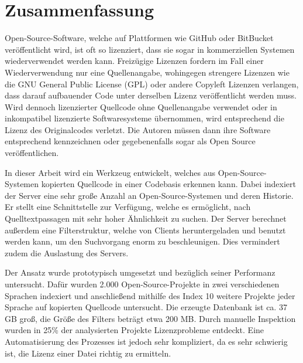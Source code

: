 \chapter{Zusammenfassung}
Open-Source-Software, welche auf Plattformen wie GitHub oder BitBucket veröffentlicht wird, ist oft so lizenziert, dass sie sogar in kommerziellen Systemen wiederverwendet werden kann.
Freizügige Lizenzen fordern im Fall einer Wiederverwendung nur eine Quellenangabe, wohingegen strengere Lizenzen wie die GNU General Public License (GPL) oder andere Copyleft Lizenzen verlangen, dass darauf aufbauender Code unter derselben Lizenz veröffentlicht werden muss.
Wird dennoch lizenzierter Quellcode ohne Quellenangabe verwendet oder in inkompatibel lizenzierte Softwaresysteme übernommen, wird entsprechend die Lizenz des Originalcodes verletzt.
Die Autoren müssen dann ihre Software entsprechend kennzeichnen oder gegebenenfalls sogar als Open Source veröffentlichen.

In dieser Arbeit wird ein Werkzeug entwickelt, welches aus Open-Source-Systemen kopierten Quellcode in einer Codebasis erkennen kann.
Dabei indexiert der Server eine sehr große Anzahl an Open-Source-Systemen und deren Historie.
Er stellt eine Schnittstelle zur Verfügung, welche es ermöglicht, nach Quelltextpassagen mit sehr hoher Ähnlichkeit zu suchen.
Der Server berechnet außerdem eine Filterstruktur, welche von Clients heruntergeladen und benutzt werden kann, um den Suchvorgang enorm zu beschleunigen.
Dies vermindert zudem die Auslastung des Servers.

Der Ansatz wurde prototypisch umgesetzt und bezüglich seiner Performanz untersucht.
Dafür wurden 2.000 Open-Source-Projekte in zwei verschiedenen Sprachen indexiert und anschließend mithilfe des Index 10 weitere Projekte jeder Sprache auf kopierten Quellcode untersucht.
Die erzeugte Datenbank ist ca. 37 GB groß, die Größe des Filters beträgt etwa 200 MB.
Durch manuelle Inspektion wurden in 25\% der analysierten Projekte Lizenzprobleme entdeckt.
Eine Automatisierung des Prozesses ist jedoch sehr kompliziert, da es sehr schwierig ist, die Lizenz einer Datei richtig zu ermitteln.